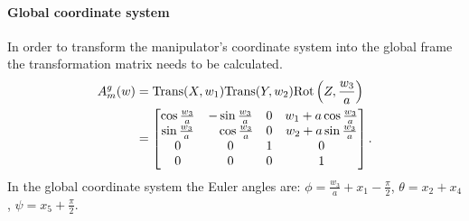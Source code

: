 \paragraph{Global coordinate system}
In order to transform the manipulator's coordinate system into the global frame the transformation matrix needs to be calculated.
\begin{equation}
\begin{aligned}
A_m^g(w)&=\mathrm{Trans}(X, w_1)\mathrm{Trans}(Y, w_2)\mathrm{Rot}\left(Z, \frac{w_3}{a}\right)\\
&= \begin{bmatrix}
\cos \frac{w_3}{a} & -\sin \frac{w_3}{a} & 0 & w_1+a\cos \frac{w_3}{a}\\
\sin \frac{w_3}{a} & \phantom{-}\cos \frac{w_3}{a} & 0 & w_2+a\sin \frac{w_3}{a}\\
0 & 0 & 1 & 0\\
0 & 0 & 0 & 1
\end{bmatrix}.
\end{aligned}
\end{equation}
In the global coordinate system the Euler angles are: $\phi=\frac{w_3}{a}+x_1-\frac{\pi}{2}$, $\theta=x_2+x_4$, $\psi=x_5+\frac{\pi}{2}$.
